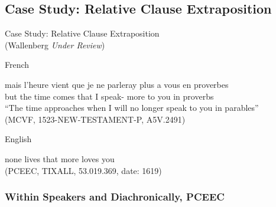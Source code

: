 \documentclass[hyperref={pdfpagelabels=false}]{beamer}
\begin{document}
\subsection{Case Study: Relative Clause Extraposition}

\begin{frame}{Case Study: Relative Clause Extraposition \\\small{(Wallenberg \textsl{Under Review})\nocite{wallenbergunderrev}}}

	\begin{block}{French}
		\begin{exe}
			\ex \gll mais l'heure vient que je ne parleray plus a vous en proverbes\\
			but {the time} comes that I  speak- more to you in proverbs\\
			\quad ``The time approaches when I will no longer speak to you in parables''\\
			(MCVF, 1523-NEW-TESTAMENT-P, A5V.2491)
		\end{exe}
	\end{block}
	
	\begin{block}{English}
		\begin{exe}
			\ex none lives that more loves you\\
			(PCEEC, TIXALL, 53.019.369, date: 1619)
		\end{exe}
	\end{block}


\end{frame}


\subsubsection{Within Speakers and Diachronically, PCEEC}
\end{document}
